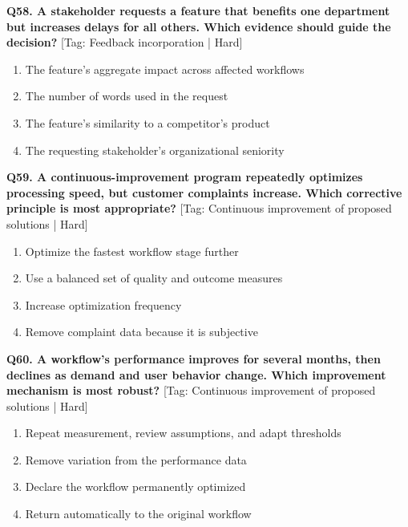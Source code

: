 \noindent\textbf{Q58. A stakeholder requests a feature that benefits one department but increases delays for all others. Which evidence should guide the decision?} \hfill [Tag: Feedback incorporation | Hard]
\begin{enumerate}[label=(\alph*),topsep=2pt,itemsep=1pt,partopsep=0pt,parsep=0pt]
    \item {The feature's aggregate impact across affected workflows}
    \item {The number of words used in the request}
    \item {The feature's similarity to a competitor's product}
    \item {The requesting stakeholder's organizational seniority}
\end{enumerate}
\vspace{2mm}

\noindent\textbf{Q59. A continuous-improvement program repeatedly optimizes processing speed, but customer complaints increase. Which corrective principle is most appropriate?} \hfill [Tag: Continuous improvement of proposed solutions | Hard]
\begin{enumerate}[label=(\alph*),topsep=2pt,itemsep=1pt,partopsep=0pt,parsep=0pt]
    \item {Optimize the fastest workflow stage further}
    \item {Use a balanced set of quality and outcome measures}
    \item {Increase optimization frequency}
    \item {Remove complaint data because it is subjective}
\end{enumerate}
\vspace{2mm}

\noindent\textbf{Q60. A workflow's performance improves for several months, then declines as demand and user behavior change. Which improvement mechanism is most robust?} \hfill [Tag: Continuous improvement of proposed solutions | Hard]
\begin{enumerate}[label=(\alph*),topsep=2pt,itemsep=1pt,partopsep=0pt,parsep=0pt]
    \item {Repeat measurement, review assumptions, and adapt thresholds}
    \item {Remove variation from the performance data}
    \item {Declare the workflow permanently optimized}
    \item {Return automatically to the original workflow}
\end{enumerate}
\vspace{2mm}


